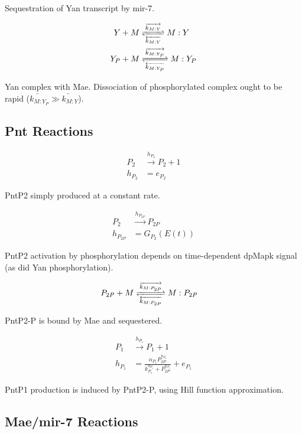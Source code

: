 \documentclass[12pt]{article}
\renewcommand{\(}{\left(}
\renewcommand{\)}{\right)}
\begin{document}
	Sequestration of Yan transcript by mir-7.
	
	\begin{align}
		Y + M &\ce{<=>[\overrightarrow{k_{M:Y}}][\overleftarrow{k_{M:Y}}]} M:Y \\
		Y_P + M &\ce{<=>[\overrightarrow{k_{M:Y_P}}][\overleftarrow{k_{M:Y_P}}]} M:Y_P
	\end{align}
	
	Yan complex with Mae. Dissociation of phosphorylated complex ought to be rapid ($\overleftarrow{k_{M:Y_P}} \gg \overleftarrow{k_{M:Y}}$). 
	
\subsection{Pnt Reactions}

\begin{align}
	P_2 &\xrightarrow{h_{P_2}} P_2 + 1 \\
	h_{P_2} &= e_{P_2} \nonumber
\end{align}

PntP2 simply produced at a constant rate.

\begin{align}
	P_2 &\xrightarrow{h_{P_{2P}}} P_{2P} \\
	h_{P_{2P}} &= G_{P_2}(E(t)) \nonumber
\end{align}

PntP2 activation by phosphorylation depends on time-dependent dpMapk signal (as did Yan phosphorylation). 

\begin{align}
	P_{2P} + M &\ce{<=>[\overrightarrow{k_{M:P_{2P}}}][\overleftarrow{k_{M:P_{2P}}}]} M:P_{2P}
\end{align}

PntP2-P is bound by Mae and sequestered. 

\begin{align}
	P_1 &\xrightarrow{h_{P_1}} P_1 + 1 \\
	h_{P_1} &= \frac{\alpha_{P_1} P_{2P}^{n_{P_1}}}{k_{P_1}^{n_{P_1}} + P_{2P}^{n_{P_1}}} + e_{P_1} \nonumber
\end{align}

PntP1 production is induced by PntP2-P, using Hill function approximation. 

\subsection{Mae/mir-7 Reactions}
\end{document}
